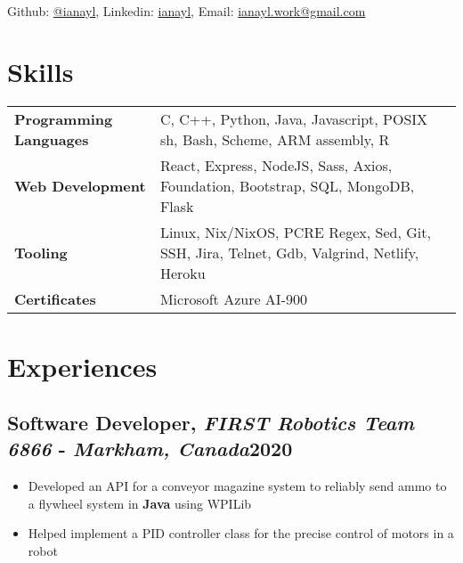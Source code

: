 \documentclass[9pt]{article}
\author{Ian Li}
\makeatletter
\renewcommand{\maketitle}{
		\vspace{-4em}
		{\huge\bfseries
		\theauthor}
    \vspace{0.2em}
    \\
    Github: \href{https://github.com/ianayl}{@ianayl}, Linkedin: \href{https://www.linkedin.com/in/ianayl}{ianayl}, Email: \url{ianayl.work@gmail.com}
}
\makeatother
\begin{document}
\maketitle


\section{Skills}

\begin{tabular}{ l l }
    \textbf{Programming Languages} & C, C++, Python, Java, Javascript, POSIX sh, Bash, Scheme, ARM assembly, R \\
    \textbf{Web Development} & React, Express, NodeJS, Sass, Axios, Foundation, Bootstrap, SQL, MongoDB, Flask \\
    \textbf{Tooling} & Linux, Nix/NixOS, PCRE Regex, Sed, Git, SSH, Jira, Telnet, Gdb, Valgrind, Netlify, Heroku \\
    \textbf{Certificates} & Microsoft Azure AI-900
\end{tabular}

\section*{Experiences}

\subsection{Software Developer, \textit{FIRST Robotics Team 6866} - \normalsize\textit{Markham, Canada}\hfill \normalsize\textnormal{2020}}
\begin{itemize}
  \item Developed an API for a conveyor magazine system to reliably send ammo to a flywheel system in \textbf{Java} using WPILib
  \item Helped implement a PID controller class for the precise control of motors in a robot
\end{itemize}
\end{document}
